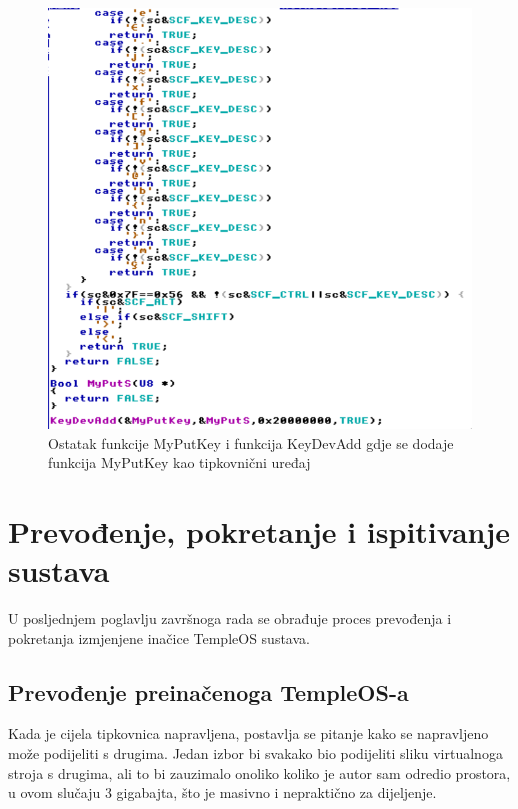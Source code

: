 \documentclass{foi}
\begin{document}
\begin{figure}[H]
    \centering
    \includegraphics[width=1.0\textwidth]{slike/altTipke2.png}
	\captionsetup{justification=centering}
	\caption{Ostatak funkcije {\selectfont MyPutKey} i funkcija {\selectfont KeyDevAdd} gdje se dodaje funkcija {\selectfont MyPutKey} kao tipkovnični uređaj}
    \label{fig:altTipke2}
\end{figure}

\chapter{Prevođenje, pokretanje i ispitivanje sustava}

U posljednjem poglavlju završnoga rada se obrađuje proces prevođenja i pokretanja izmjenjene inačice TempleOS sustava.

\section{Prevođenje preinačenoga TempleOS-a\label{dodavanjeALTTipaka}}

Kada je cijela tipkovnica napravljena, postavlja se pitanje kako se napravljeno može podijeliti s drugima. Jedan izbor bi svakako bio podijeliti sliku virtualnoga stroja s drugima, ali to bi zauzimalo onoliko koliko je autor sam odredio prostora, u ovom slučaju 3 gigabajta, što je masivno i nepraktično za dijeljenje.
\end{document}
